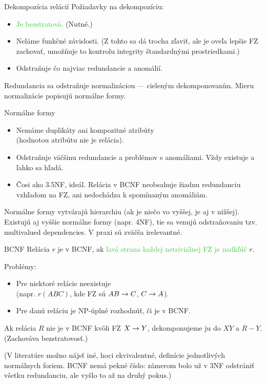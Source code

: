 \documentclass[12pt]{beamer}
\def\blue#1{\textcolor{Cerulean}{#1}}
\def\green#1{\textcolor{LimeGreen}{#1}}
\begin{document}
\begin{frame}[fragile]{Dekompozícia relácií}
Požiadavky na dekompozíciu:
\begin{itemize}
\item \green{Je bezstratová.} (Nutné.)
\item \blue{Neláme funkčné závislosti.} (Z tohto sa dá trocha zľaviť,
            ale je oveľa lepšie FZ zachovať, umožňuje to kontrolu integrity štandardnými prostriedkami.)
\item \alert{Odstraňuje čo najviac redundancie a anomálií.}
\end{itemize}
Redundancia sa odstraňuje \alert{normalizáciou} --- cieleným dekomponovaním.
Mieru normalizácie popisujú \alert{normálne formy}.
\end{frame}

\begin{frame}[fragile]{Normálne formy}
\begin{itemize}
\item[\alert{1NF}] Nemáme duplikáty ani kompozitné atribúty\\ (hodnotou atribútu nie je relácia).
\item[\alert{3NF}] Odstraňuje väčšinu redundancie a problémov s anomáliami. Vždy existuje a ľahko sa hľadá.
\item[\alert{BCNF}] Čosi ako 3.5NF, ideál. Relácia v BCNF neobsahuje žiadnu redundanciu vzhľadom na FZ, ani nedochádza k spomínaným anomáliám.
\end{itemize}
Normálne formy vytvárajú hierarchiu (ak je niečo vo vyššej, je aj v nižšej).
Existujú aj vyššie normálne formy (napr. 4NF), tie sa venujú odstraňovaniu tzv. multivalued dependencies.
V praxi sú zväčša irelevantné.
\end{frame}

\begin{frame}[fragile]{BCNF}
Relácia $r$ je v BCNF, ak \green{ľavá strana každej netriviálnej FZ je nadkľúč} $r$.

\bigskip
Problémy:
\begin{itemize}
\item Pre niektoré relácie neexistuje\\ (napr. $r(ABC)$, kde FZ sú $AB\rightarrow C$, $C\rightarrow A$).
\item Pre danú reláciu je NP-úplné rozhodnúť, či je v BCNF.
\end{itemize}

\bigskip
Ak relácia $R$ nie je v BCNF kvôli FZ $X\rightarrow Y$, dekomponujeme ju do $XY$ a $R-Y$.
(Zachováva bezstratovosť.)

(V literatúre možno nájsť iné, hoci ekvivalentné, definície jednotlivých normálnych foriem.
BCNF nemá pekné číslo: zámerom bolo už v 3NF odstrániť všetku redundanciu,
ale vyšlo to až na druhý pokus.)
\end{frame}
\end{document}
